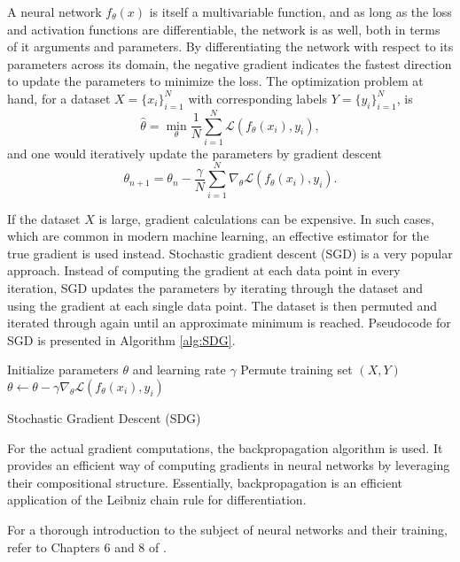\documentclass[../../thesis.tex]{subfiles}
\begin{document}
A neural network $f_\theta(x)$ is itself a multivariable function, and as long as the loss and activation functions are differentiable, the network is as well, both in terms of it arguments and parameters. By differentiating the network with respect to its parameters across its domain, the negative gradient indicates the fastest direction to update the parameters to minimize the loss. The optimization problem at hand, for a dataset $X = \{x_i\}_{i=1}^N$ with corresponding labels $Y = \{y_i\}_{i=1}^N$, is
\[
   \widehat{\theta} = \min_{\theta} \frac{1}{N}\sum_{i=1}^N \mathcal{L}(f_\theta(x_i),y_i),
\]
and one would iteratively update the parameters by gradient descent 
\[
    \theta_{n+1} = \theta_{n} - \frac{\gamma}{N}\sum_{i=1}^N\nabla_\theta \mathcal{L}(f_\theta(x_i),y_i).
\]

If the dataset $X$ is large, gradient calculations can be expensive. In such cases, which are common in modern machine learning, an effective estimator for the true gradient is used instead. Stochastic gradient descent (SGD) is a very popular approach. Instead of computing the gradient at each data point in every iteration, SGD updates the parameters by iterating through the dataset and using the gradient at each single data point. The dataset is then permuted and iterated through again until an approximate minimum is reached. Pseudocode for SGD is presented in Algorithm \ref{alg:SDG}.

\begin{algorithm}
\begin{algorithmic}
    \State Initialize parameters $\theta$ and learning rate $\gamma$
        \State Permute training set $(X,Y)$
        \State $\theta \gets \theta - \gamma\nabla_\theta \mathcal{L}(f_\theta(x_i),y_i)$
    \EndFor
    \EndWhile
\end{algorithmic}
\caption{Stochastic Gradient Descent (SDG)}
\label{alg:SDG}
\end{algorithm}

For the actual gradient computations, the backpropagation algorithm is used. It provides an efficient way of computing gradients in neural networks by leveraging their compositional structure. Essentially, backpropagation is an efficient application of the Leibniz chain rule for differentiation.\newline

For a thorough introduction to the subject of neural networks and their training, refer to Chapters 6 and 8 of \cite{deeplearningbook}.
\end{document}
